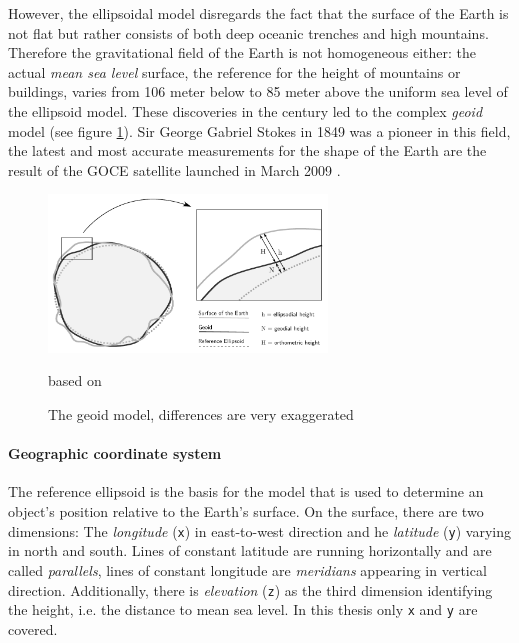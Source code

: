 However, the ellipsoidal model disregards the fact that the surface of the Earth is not flat but rather consists of both deep oceanic trenches and high mountains. Therefore the gravitational field of the Earth is not homogeneous either: the actual \emph{mean sea level} surface, the reference for the height of mountains or buildings, varies from 106 meter below to 85 meter above the uniform sea level of the ellipsoid model. These discoveries in the  century led to the complex \emph{geoid} model (see figure \ref{fig:geoid}). Sir George Gabriel Stokes in 1849 was a pioneer in this field, the latest and most accurate measurements for the shape of the Earth are the result of the GOCE satellite launched in March 2009
\cite{geoid, geoidESRI}.


\begin{figure}[ht]
  \centering
  \includegraphics[width=0.66\textwidth]{graphics/basics/geoid}
  \caption{The geoid model, differences are very exaggerated}
  \small{based on \cite[Fig. 3-6, p. 75]{bolstad2008gis}}
  \label{fig:geoid}
\end{figure}


\paragraph{Geographic coordinate system} %
\label{par:geographic_coordinate_system}

The reference ellipsoid is the basis for the model that is used to determine an object's position relative to the Earth's surface. On the surface, there are two dimensions: The \emph{longitude} (\texttt{x}) in east-to-west direction and he \emph{latitude} (\texttt{y}) varying in north and south. Lines of constant latitude are running horizontally and are called \emph{parallels}, lines of constant longitude are \emph{meridians} appearing in vertical direction. Additionally, there is \emph{elevation} (\texttt{z}) as the third dimension identifying the height, i.e. the distance to mean sea level. In this thesis only \texttt{x} and \texttt{y} are covered.

